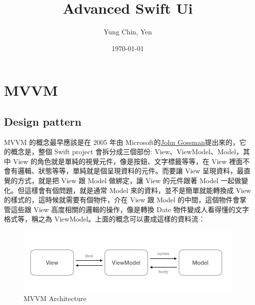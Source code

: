 \documentclass[a4paper,12pt]{article}
\author{Yung Chin, Yen}
\date{\today}
\title{Advanced Swift Ui}
\begin{document}
\maketitle
\tableofcontents

\newpage

\section{MVVM}
\label{SW-MVVM}
\subsection{Design pattern}
\label{sec:orgdee0494}
MVVM 的概念最早應該是在 2005 年由 Microsoft的\href{https://blogs.msdn.microsoft.com/johngossman/2005/10/08/introduction-to-modelviewviewmodel-pattern-for-building-wpf-apps/}{John Gossman}提出來的，它的概念是，整個 Swift project 會拆分成三個部份: View、ViewModel、Model，其中 View 的角色就是單純的視覺元件，像是按鈕、文字標籤等等，在 View 裡面不會有邏輯、狀態等等，單純就是個呈現資料的元件。而要讓 View 呈現資料，最直覺的方式，就是把 View 跟 Model 做綁定，讓 View 的元件跟著 Model 一起做變化。但這樣會有個問題，就是通常 Model 來的資料，並不是簡單就能轉換成 View 的樣式的，這時候就需要有個物件，介在 View 跟 Model 的中間，這個物件會掌管這些跟 View 高度相關的邏輯的操作，像是轉換 Date 物件變成人看得懂的文字格式等，稱之為 ViewModel。上面的概念可以畫成這樣的資料流：\\

\begin{figure}[htbp]
\centering
\includegraphics[width=500]{images/MVVM-Basic.jpg}
\caption{\label{fig: MVVMPNG}MVVM Architecture}
\end{figure}
\end{document}
